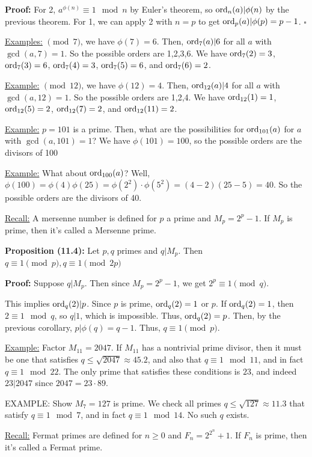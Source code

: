 \documentclass{article}
\newcommand*{\qed}{\hfill$\square$}%
\begin{document}
\textbf{Proof:} For 2, $a^{\phi(n)}\equiv 1\mod n$ by Euler's theorem, so $\text{ord}_n(a)|\phi(n)$ by the previous theorem. For 1, we can apply 2 with $n=p$ to get $\text{ord}_p(a)|\phi(p)=p-1$. \qed

\underline{Examples:} $\pmod 7$, we have $\phi(7)=6$. Then, $\text{ord}_7(a)|6$ for all $a$ with $\gcd(a,7)=1$. So the possible orders are 1,2,3,6. We have $\text{ord}_7(2)=3$, $\text{ord}_7(3)=6$, $\text{ord}_7(4)=3$, $\text{ord}_7(5)=6$, and $\text{ord}_7(6)=2$.

\underline{Example:} $\pmod 12$, we have $\phi(12)=4$. Then, $\text{ord}_{12}(a)|4$ for all $a$ with $\gcd(a,12)=1$. So the possible orders are 1,2,4. We have $\text{ord}_{12}(1)=1$, $\text{ord}_{12}(5)=2$, $\text{ord}_{12}(7)=2$, and $\text{ord}_{12}(11)=2$.

\underline{Example:} $p=101$ is a prime. Then, what are the possibilities for $\text{ord}_{101}(a)$ for $a$ with $\gcd(a,101)=1$? We have $\phi(101)=100$, so the possible orders are the divisors of 100

\underline{Example:} What about $\text{ord}_{100}(a)$? Well, $\phi(100)=\phi(4)\phi(25)=\phi(2^2)\cdot \phi(5^2)=(4-2)(25-5)=40$. So the possible orders are the divisors of 40.

\underline{Recall:} A mersenne number is defined for $p$ a prime and $M_p=2^p-1$. If $M_p$ is prime, then it's called a Mersenne prime.

\textbf{Proposition (11.4):} Let $p,q$ primes and $q|M_p$. Then $q\equiv 1\pmod p, q\equiv 1\pmod{2p}$

\textbf{Proof:} Suppose $q|M_p$. Then since $M_p=2^p-1$, we get $2^p\equiv 1\pmod q$. 

This implies $\text{ord}_q(2)|p$. Since $p$ is prime, $\text{ord}_q(2)=1$ or $p$. If $\text{ord}_q(2)=1$, then $2\equiv 1\mod q$, so $q|1$, which is impossible. Thus, $\text{ord}_q(2)=p$. Then, by the previous corollary, $p|\phi(q)=q-1$. Thus, $q\equiv 1\pmod p$.

\underline{Example:} Factor $M_{11}=2047$. If $M_{11}$ has a nontrivial prime divisor, then it must be one that satisfies $q\leq \sqrt{2047}\approx 45.2$, and also that $q\equiv 1\mod{11}$, and in fact $q\equiv 1\mod{22}$. The only prime that satisfies these conditions is $23$, and indeed $23|2047$ since $2047=23\cdot 89$.

\uppercase{Example:} Show $M_7=127$ is prime. We check all primes $q\leq \sqrt{127}\approx 11.3$ that satisfy $q\equiv 1\mod{7}$, and in fact $q\equiv 1\mod{14}$. No such $q$ exists. 

\underline{Recall:} Fermat primes are defined for $n\geq 0$ and $F_n=2^{2^n}+1$. If $F_n$ is prime, then it's called a Fermat prime.
\end{document}
